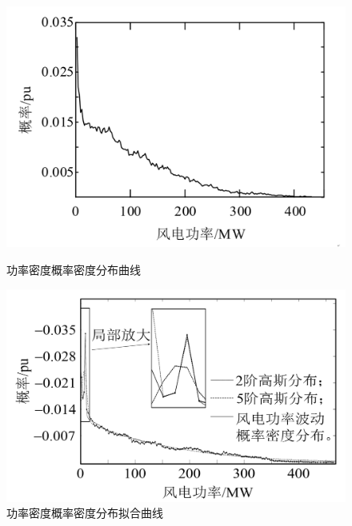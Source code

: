 \begin{figure}[htbp]
	\centering
	\begin{minipage}{0.49\linewidth}
		\centering
		\includegraphics[width=0.9\linewidth]{figures/功率波动概率密度分布曲线}
		\caption{功率密度概率密度分布曲线}
		\label{功率密度概率密度分布曲线}%
	\end{minipage}
	\begin{minipage}{0.49\linewidth}
		\centering
		\includegraphics[width=\linewidth]{figures/功率波动概率密度分布拟合曲线}
		\caption{功率密度概率密度分布拟合曲线}
		\label{功率密度概率密度分布拟合曲线}%
	\end{minipage}
\end{figure}

